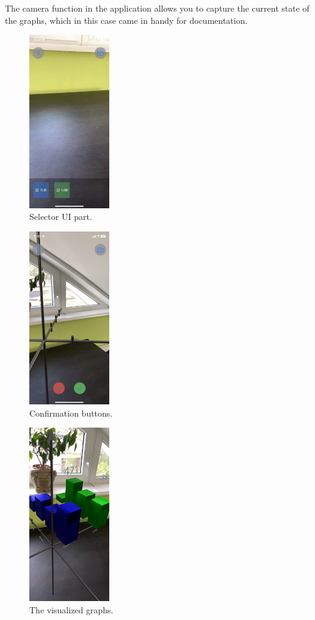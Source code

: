 \documentclass[a4paper,oneside]{article}
\begin{document}
The camera function in the application allows you to capture the current state of the graphs, which in this case came in handy for documentation.
\begin{figure}[!ht]
  \centering
  \includegraphics[height=75mm, keepaspectratio]{../images/selector.jpeg}
  \caption{Selector UI part.}
  \label{fig:selector}
\end{figure}

\begin{figure}[!ht]
  \centering
  \includegraphics[height=75mm, keepaspectratio]{../images/megerosites.jpeg}
  \caption{Confirmation buttons.}
  \label{fig:megerosites}
\end{figure}


\begin{figure}[!ht]
  \centering
  \includegraphics[height=75mm, keepaspectratio]{../images/top.jpeg}
  \caption{The visualized graphs.}
  \label{fig:top}
\end{figure}
\end{document}
